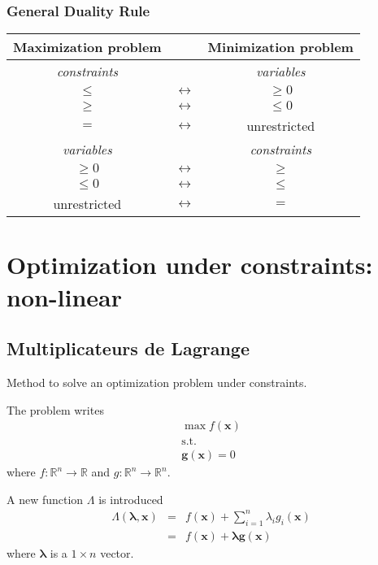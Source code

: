 \subsubsection{General Duality Rule}
\begin{center}
\begin{tabular}{|ccc|}
\hline
\textbf{Maximization problem} & & \textbf{Minimization problem}\\
\hline
\emph{constraints}& & \emph{variables}\\
$\leq$ &$\leftrightarrow$ & $\geq0$\\
$\geq$ &$\leftrightarrow$ & $\leq0$\\
$=$ &$\leftrightarrow$ & unrestricted\\
\hline
\emph{variables} & &\emph{constraints}\\
$\geq0$ &$\leftrightarrow$ & $\geq$\\
$\leq0$ &$\leftrightarrow$ & $\leq$\\
unrestricted &$\leftrightarrow$ & $=$\\
\hline
\end{tabular}
\end{center}

\section{Optimization under constraints: non-linear}

\subsection{Multiplicateurs de Lagrange}
Method to solve an optimization problem under constraints.

The problem writes
\begin{eqnarray}
	\max f(\mathbf{x})\\
	\text{s.t.}\nonumber
	\\
	\mathbf{g}(\mathbf{x})=0\nonumber
\end{eqnarray}
where $f: \mathbb R^n\rightarrow\mathbb R$ and $g: \mathbb R^n\rightarrow\mathbb R^n$.

A new function $\Lambda$ is introduced
\begin{eqnarray}
	\Lambda(\mathbf{\lambda}, \mathbf{x}) 
	&=& f( \mathbf{x})+\sum_{i=1}^n\lambda_ig_i(\mathbf{x})\\
	&=& f( \mathbf{x})+\mathbf{\lambda} \mathbf{g}(\mathbf{x})
\end{eqnarray}
where $\mathbf{\lambda}$ is a $1\times n$ vector.

